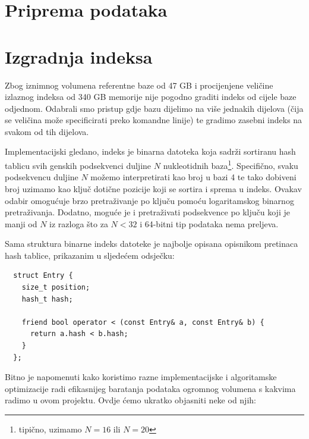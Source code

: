 \documentclass[times, utf8, diplomski]{fer}
\begin{document}
\section{Priprema podataka}

\section{Izgradnja indeksa}
Zbog iznimnog volumena referentne baze od 47 GB i procijenjene veličine izlaznog indeksa od 340 GB memorije nije
pogodno graditi indeks od cijele baze odjednom. Odabrali smo pristup gdje bazu dijelimo na više jednakih dijelova
(čija se veličina može specificirati preko komandne linije) te gradimo zasebni indeks na svakom od tih dijelova.

Implementacijski gledano, indeks je binarna datoteka koja sadrži sortiranu hash tablicu svih genskih podsekvenci
duljine $N$ nukleotidnih baza\footnote{tipično, uzimamo $N = 16$ ili $N = 20$}. Specifično, svaku podsekvencu
duljine $N$ možemo interpretirati kao broj u bazi 4 te tako dobiveni broj uzimamo kao ključ dotične pozicije koji se sortira i sprema u indeks. Ovakav odabir omogućuje brzo pretraživanje po ključu pomoću logaritamskog binarnog 
pretraživanja. Dodatno, moguće je i pretraživati podsekvence po ključu koji je manji od $N$
iz razloga što za $N < 32$ i 64-bitni tip podataka nema preljeva.

Sama struktura binarne indeks datoteke je najbolje opisana opisnikom pretinaca hash tablice, prikazanim u sljedećem
odsječku:

\begin{lstlisting}
  struct Entry {
    size_t position;
    hash_t hash;

    friend bool operator < (const Entry& a, const Entry& b) {
      return a.hash < b.hash;
    }
  };
\end{lstlisting}

Bitno je napomenuti kako koristimo razne implementacijske i algoritamske optimizacije radi efikasnijeg
baratanja podataka ogromnog volumena s kakvima radimo u ovom projektu. Ovdje ćemo ukratko objasniti neke od njih:
\end{document}
